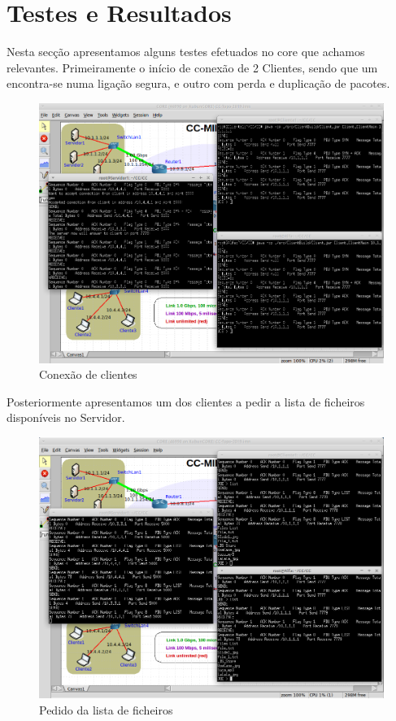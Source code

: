 \documentclass{article}
\begin{document}
\newpage
\section{Testes e Resultados}
Nesta secção apresentamos alguns testes efetuados no core que achamos relevantes. Primeiramente o início de conexão de 2 Clientes, sendo
que um encontra-se numa ligação segura, e outro com perda e duplicação de pacotes.
\begin{figure}[H]
\centering
\includegraphics[scale=0.4]{img/connection.png}
\caption{Conexão de clientes}
\end{figure}
Posteriormente apresentamos um dos clientes a pedir a lista de ficheiros disponíveis no Servidor.
\begin{figure}[H]
\centering
\includegraphics[scale=0.4]{img/list.png}
\caption{Pedido da lista de ficheiros}
\end{figure}
\end{document}
